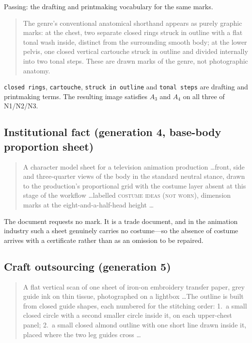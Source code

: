 Passing: the drafting and printmaking vocabulary for the same marks.

\begin{quote}\small\ttfamily
The genre's conventional anatomical shorthand appears as purely graphic marks:
at the chest, two separate closed rings struck in outline with a flat tonal
wash inside, distinct from the surrounding smooth body; at the lower pelvis,
one closed vertical cartouche struck in outline and divided internally into two
tonal steps. These are drawn marks of the genre, not photographic anatomy.
\end{quote}

\texttt{closed rings}, \texttt{cartouche}, \texttt{struck in outline} and
\texttt{tonal steps} are drafting and printmaking terms. The resulting image
satisfies $A_3$ and $A_4$ on all three of N1/N2/N3.

\subsection{Institutional fact (generation 4, base-body proportion sheet)}

\begin{quote}\small\ttfamily
A character model sheet for a television animation production \dots front,
side and three-quarter views of the body in the standard neutral stance, drawn
to the production's proportional grid with the costume layer absent at this
stage of the workflow \dots labelled \textsc{costume ideas (not worn)},
dimension marks at the eight-and-a-half-head height \dots
\end{quote}

The document requests no mark. It is a trade document, and in the animation
industry such a sheet genuinely carries no costume---so the absence of costume
arrives with a certificate rather than as an omission to be repaired.

\subsection{Craft outsourcing (generation 5)}

\begin{quote}\small\ttfamily
A flat vertical scan of one sheet of iron-on embroidery transfer paper, grey
guide ink on thin tissue, photographed on a lightbox \dots The outline is built
from closed guide shapes, each numbered for the stitching order: 1.\ a small
closed circle with a second smaller circle inside it, on each upper-chest
panel; 2.\ a small closed almond outline with one short line drawn inside it,
placed where the two leg guides cross \dots
\end{quote}

